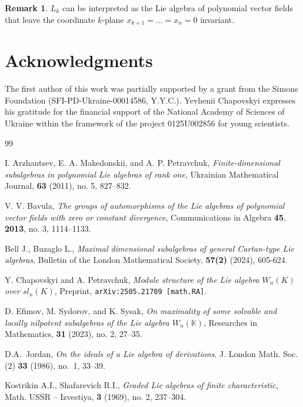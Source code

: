 \documentclass[12pt,a4paper]{amsart}
\theoremstyle{plain}
\theoremstyle{definition}
\newtheorem{remark}{Remark}
\begin{document}
{	\begin{remark}
		$L_k$ can be interpreted as the Lie algebra of polynomial vector fields that leave the coordinate $k$-plane $x_{k+1} = \dots = x_n = 0$ invariant.
	\end{remark}
	
	\section*{Acknowledgments}	%
	{The first author of this work was partially supported by a grant
		from the Simons Foundation (SFI-PD-Ukraine-00014586, Y.Y.C.).
		Yevhenii Chapovskyi expresses his gratitude for the financial support of the National Academy of Sciences of Ukraine
		within the framework of the project 0125U002856 for young scientists.}
	
	\begin{thebibliography}{99}
		
		
		 I. Arzhantsev, E. A. Makedonskii, and A. P. Petravchuk, \textit{Finite-dimensional subalgebras in polynomial Lie algebras of rank one}, Ukrainian Mathematical Journal, \textbf{63} (2011), no. 5, 827--832.
		
		 V. V. Bavula, \textit{The groups of automorphisms of the Lie algebras of polynomial vector fields with zero or constant divergence}, Communications in Algebra  \textbf{45}, \textbf{2013}, no. 3,  1114--1133. 
		
		 Bell J.,  Buzaglo L., \textit{Maximal dimensional subalgebras of general Cartan-type Lie algebras},  Bulletin of the London
		Mathematical Society, \textbf{57(2)}  (2024), 605-624.
		
		 Y. Chapovskyi and A. Petravchuk, \textit{Module structure of the Lie algebra
			$W_n(K)$ over $sl_n(K)$}, Preprint, \texttt{arXiv:2505.21709 [math.RA]}.
		
		 D. Efimov, M. Sydorov, and K. Sysak, \textit{On maximality of some solvable and locally nilpotent subalgebras of the Lie algebra $W_n(\mathbb{K})$}, Researches in Mathematics, \textbf{31} (2023), no. 2,  27--35. 
		
		D.A.~Jordan, \textit{On the ideals of a Lie algebra of derivations}.
		J. London Math. Soc. (2) {\bf 33} (1986), no.~1, 33--39.
		
		 Kostrikin A.I., Shafarevich R.I.,  \textit{Graded Lie algebras of finite
			characteristic},  Math. USSR -- Izvestiya, \textbf{3} (1969),  no. 2,  237--304. 
		

\end{thebibliography}}
\end{document}

